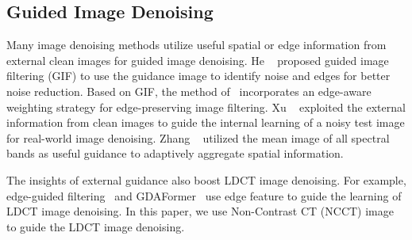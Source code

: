 \subsection{Guided Image Denoising}
\label{subsec:guided}

Many image denoising methods utilize useful spatial or edge information from external clean images for guided image denoising. He \etal~\cite{He} proposed guided image filtering (GIF) to use the guidance image to identify noise and edges for better noise reduction. Based on GIF, the method of~\cite{WGIF} incorporates an edge-aware weighting strategy for edge-preserving image filtering. Xu \etal~\cite{NSS} exploited the external information from clean images to guide the internal learning of a noisy test image for real-world image denoising. Zhang \etal~\cite{zhang2022guided} utilized the mean image of all spectral bands as useful guidance to adaptively aggregate spatial information.

The insights of external guidance also boost LDCT image denoising. For example, edge-guided filtering~\cite{edge-guided} and GDAFormer~\cite{Jiang2024GDAFormerGD} use edge feature to guide the learning of LDCT image denoising.
In this paper, we use Non-Contrast CT (NCCT) image to guide the LDCT image denoising.